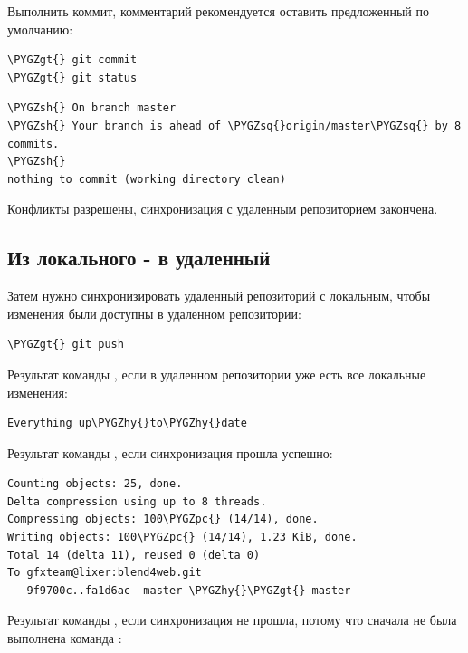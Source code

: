 \documentclass[a4paper,12pt,oneside]{sphinxmanual}
\def\PYGZgt{\char`\>}
\def\PYGZsh{\char`\#}
\def\PYGZpc{\char`\%}
\def\PYGZhy{\char`\-}
\def\PYGZsq{\char`\'}
\begin{document}
Выполнить коммит, комментарий рекомендуется оставить предложенный по умолчанию:

\begin{Verbatim}[commandchars=\\\{\}]
\PYGZgt{} git commit
\PYGZgt{} git status
\end{Verbatim}

\begin{Verbatim}[commandchars=\\\{\}]
\PYGZsh{} On branch master
\PYGZsh{} Your branch is ahead of \PYGZsq{}origin/master\PYGZsq{} by 8 commits.
\PYGZsh{}
nothing to commit (working directory clean)
\end{Verbatim}

Конфликты разрешены, синхронизация с удаленным репозиторием закончена.


\subsection{Из локального - в удаленный}
\label{git_short_manual:id18}
Затем нужно синхронизировать удаленный репозиторий с локальным, чтобы изменения были доступны в удаленном репозитории:

\begin{Verbatim}[commandchars=\\\{\}]
\PYGZgt{} git push
\end{Verbatim}

Результат команды , если в удаленном репозитории уже есть все локальные изменения:

\begin{Verbatim}[commandchars=\\\{\}]
Everything up\PYGZhy{}to\PYGZhy{}date
\end{Verbatim}

Результат команды , если синхронизация прошла успешно:

\begin{Verbatim}[commandchars=\\\{\}]
Counting objects: 25, done.
Delta compression using up to 8 threads.
Compressing objects: 100\PYGZpc{} (14/14), done.
Writing objects: 100\PYGZpc{} (14/14), 1.23 KiB, done.
Total 14 (delta 11), reused 0 (delta 0)
To gfxteam@lixer:blend4web.git
   9f9700c..fa1d6ac  master \PYGZhy{}\PYGZgt{} master
\end{Verbatim}

Результат команды , если синхронизация не прошла, потому что сначала не была выполнена команда :
\end{document}
